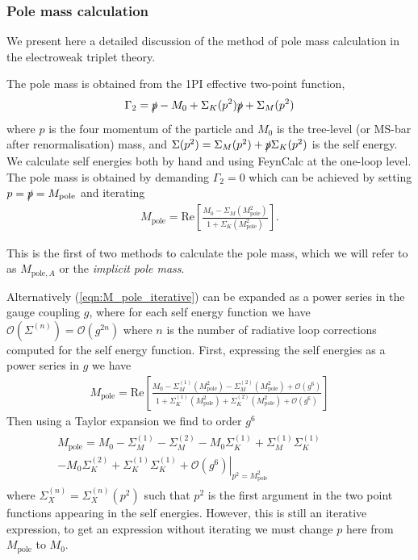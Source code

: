 \documentclass[11pt]{article}
\def\Mp{M_{\text{pole}}}
\def\Mpa{M_{\text{pole},A}}
\begin{document}
\subsubsection{Pole mass calculation}

We present here a detailed discussion of the method of pole mass calculation in the electroweak triplet theory.

The pole mass is obtained from the 1PI effective two-point function,
\begin{equation}
\Gamma_2=\slashed{p}-M_0+\Sigma_K(p^2)\slashed{p}+\Sigma_M(p^2) \label{eqn:propagator}
\end{equation}
where $p$ is the four momentum of the particle and $M_0$ is the tree-level (or MS-bar after renormalisation) mass, and $\Sigma(p^2)=\Sigma_M(p^2)+\slashed{p}\Sigma_K(p^2)$ is the self energy.  We calculate self energies both by hand and using FeynCalc \cite{Mertig1991,Shtabovenko2016} at the one-loop level.  The pole mass is obtained by demanding $\Gamma_2=0$ which can be achieved by setting $p=\slashed{p}=\Mp$ and iterating
\begin{align}
\Mp=\text{Re}\left[\frac{M_0-\Sigma_M(\Mp^2)}{1+\Sigma_K(\Mp^2)}\right]. \label{eqn:M_pole_iterative}
\end{align}

This is the first of two methods to calculate the pole mass, which we will refer to as $\Mpa$ or the \textit{implicit pole mass}.

Alternatively (\ref{eqn:M_pole_iterative}) can be expanded as a power series in the gauge coupling $g$, where for each self energy function we have $\mathcal{O}(\Sigma^{(n)})=\mathcal{O}(g^{2n})$ where $n$ is the number of radiative loop corrections computed for the self energy function.  First, expressing the self energies as a power series in $g$ we have
\begin{align}
\Mp=\text{Re}\left[\frac{M_0-\Sigma^{(1)}_M(\Mp^2)-\Sigma^{(2)}_M(\Mp^2)+\mathcal{O}(g^6)}{1+\Sigma^{(1)}_K(\Mp^2)+\Sigma^{(2)}_K(\Mp^2)+\mathcal{O}(g^6)}\right] \label{eqn:M_pole_1}
\end{align}
Then using a Taylor expansion we find to order $g^6$
\begin{align*}
\begin{split}
\Mp=M_0-\Sigma^{(1)}_M-\Sigma^{(2)}_M-M_0\Sigma^{(1)}_K+\Sigma^{(1)}_M\Sigma^{(1)}_K\ \ \ \ \ \ \ \ \ \ \  \ \ &\\ \left.-M_0\Sigma^{(2)}_K+\Sigma^{(1)}_K\Sigma^{(1)}_K+\mathcal{O}(g^6)\right|_{p^2=\Mp^2}&
\end{split}
\end{align*}
where $\Sigma^{(n)}_X=\Sigma^{(n)}_X(p^2)$ such that $p^2$ is the first argument in the two point functions appearing in the self energies. However, this is still an iterative expression, to get an expression without iterating we must change $p$ here from $\Mp$ to $M_0$.
\end{document}
